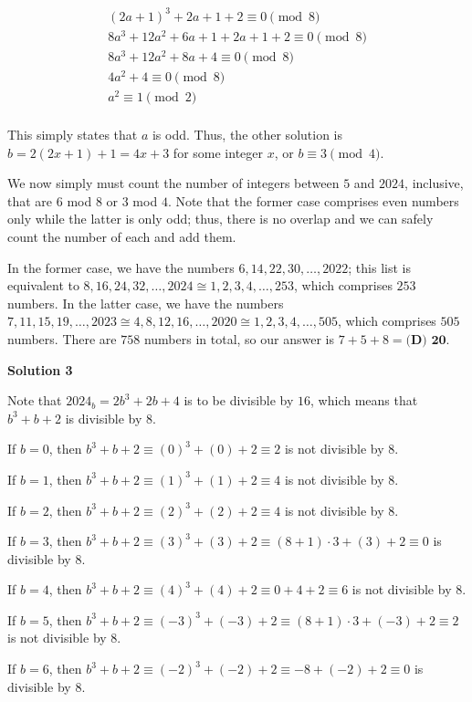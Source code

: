 \begin{enumerate}
 \begin{align*}(2a+1)^3+2a+1+2\equiv0\pmod8 \\8a^3+12a^2+6a+1+2a+1+2\equiv0\pmod8 \\8a^3+12a^2+8a+4\equiv0\pmod8 \\4a^2+4\equiv0\pmod8 \\a^2\equiv1\pmod2 \\\end{align*}


 This simply states that $a$ is odd. Thus, the other solution is $b=2(2x+1)+1=4x+3$ for some integer $x$, or $b\equiv3\pmod4$. 

 We now simply must count the number of integers between $5$ and $2024$, inclusive, that are $6$ mod $8$ or $3$ mod $4$. Note that the former case comprises even numbers only while the latter is only odd; thus, there is no overlap and we can safely count the number of each and add them. 

 In the former case, we have the numbers $6,14,22,30,\dots,2022$; this list is equivalent to $8,16,24,32,\dots,2024\cong1,2,3,4,\dots,253$, which comprises $253$ numbers. In the latter case, we have the numbers $7,11,15,19,\dots,2023\cong4,8,12,16,\dots,2020\cong1,2,3,4,\dots,505$, which comprises $505$ numbers. There are $758$ numbers in total, so our answer is $7+5+8=\boxed{\textbf{(D) 20}}$. 

 



\textbf{Solution 3}

Note that $2024_b=2b^3+2b+4$ is to be divisible by $16$, which means that $b^3+b+2$ is divisible by $8$.

 If $b=0$, then $b^3+b+2 \equiv (0)^3 + (0) + 2 \equiv 2$ is not divisible by $8$.

 If $b=1$, then $b^3+b+2 \equiv (1)^3 + (1) + 2  \equiv 4$ is not divisible by $8$.

 If $b=2$, then $b^3+b+2 \equiv (2)^3 + (2) + 2  \equiv 4$ is not divisible by $8$.

 If $b=3$, then $b^3+b+2 \equiv (3)^3 + (3) + 2  \equiv (8+1)\cdot3 + (3) + 2 \equiv 0$ is divisible by $8$.

 If $b=4$, then $b^3+b+2 \equiv (4)^3 + (4) + 2 \equiv 0 + 4 + 2 \equiv 6$ is not divisible by $8$.

 If $b=5$, then $b^3+b+2 \equiv (-3)^3 + (-3) + 2 \equiv  (8+1)\cdot 3 + (-3) + 2 \equiv 2$ is not divisible by $8$.

 If $b=6$, then $b^3+b+2 \equiv (-2)^3 + (-2) + 2 \equiv -8 + (-2) + 2 \equiv 0$ is divisible by $8$.


\end{enumerate}
